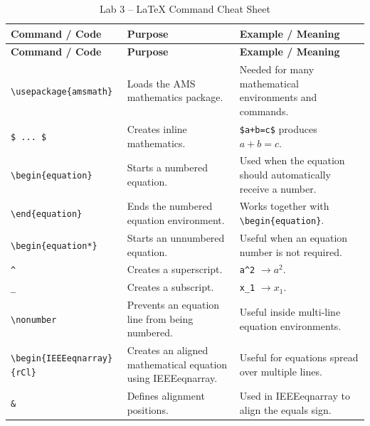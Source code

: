 \documentclass[a4paper,10pt]{article}
\begin{document}
\begin{longtable}{p{} p{} p{}}
\caption{Lab 3 -- LaTeX Command Cheat Sheet}
\\
\toprule
\textbf{Command / Code} &
\textbf{Purpose} &
\textbf{Example / Meaning}
\\
\midrule
\endfirsthead

\toprule
\textbf{Command / Code} &
\textbf{Purpose} &
\textbf{Example / Meaning}
\\
\midrule
\endhead

\bottomrule
\endfoot

\texttt{\textbackslash usepackage\{amsmath\}} &
Loads the AMS mathematics package. &
Needed for many mathematical environments and commands.
\\

\texttt{\$ ... \$} &
Creates inline mathematics. &
\texttt{\$a+b=c\$} produces $a+b=c$.
\\

\texttt{\textbackslash begin\{equation\}} &
Starts a numbered equation. &
Used when the equation should automatically receive a number.
\\

\texttt{\textbackslash end\{equation\}} &
Ends the numbered equation environment. &
Works together with \texttt{\textbackslash begin\{equation\}}.
\\

\texttt{\textbackslash begin\{equation*\}} &
Starts an unnumbered equation. &
Useful when an equation number is not required.
\\

\texttt{\textasciicircum} &
Creates a superscript. &
\texttt{a\textasciicircum2} $\rightarrow a^2$.
\\

\texttt{\_} &
Creates a subscript. &
\texttt{x\_1} $\rightarrow x_1$.
\\

\texttt{\textbackslash nonumber} &
Prevents an equation line from being numbered. &
Useful inside multi-line equation environments.
\\

\texttt{\textbackslash begin\{IEEEeqnarray\}\{rCl\}} &
Creates an aligned mathematical equation using
IEEEeqnarray. &
Useful for equations spread over multiple lines.
\\

\texttt{\&} &
Defines alignment positions. &
Used in IEEEeqnarray to align the equals sign.
\\


\end{longtable}
\end{document}
